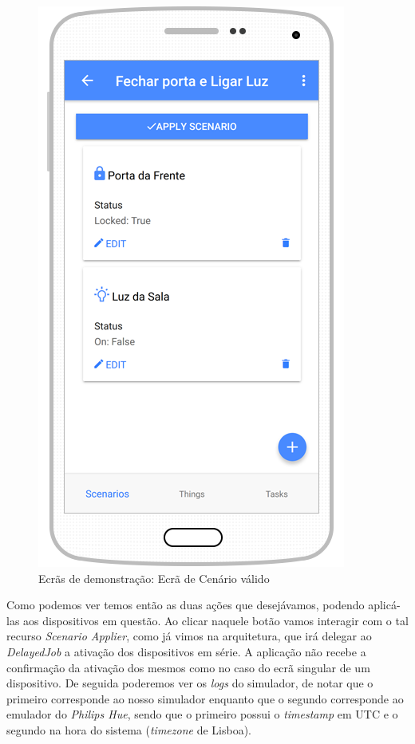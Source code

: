 \begin{figure}[H]
  \centering
        \includegraphics[scale=0.6]{img/demo/show_scenario_with_things.png}
  \caption{Ecrãs de demonstração: Ecrã de Cenário válido}
\end{figure}

Como podemos ver temos então as duas ações que desejávamos, podendo aplicá-las aos dispositivos em questão. Ao clicar naquele botão vamos interagir com o tal recurso \textit{Scenario Applier}, como já vimos na arquitetura, que irá delegar ao \textit{DelayedJob} a ativação dos dispositivos em série. A aplicação não recebe a confirmação da ativação dos mesmos como no caso do ecrã singular de um dispositivo. De seguida poderemos ver os \textit{logs} do simulador, de notar que o primeiro corresponde ao nosso simulador enquanto que o segundo corresponde ao emulador do \textit{Philips Hue}, sendo que o primeiro possui o \textit{timestamp} em UTC e o segundo na hora do sistema (\textit{timezone} de Lisboa).


